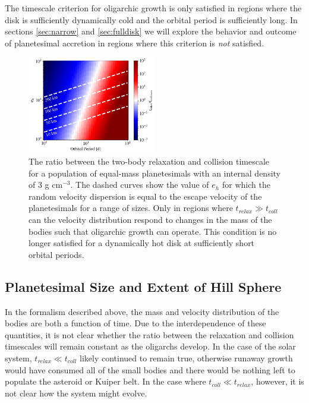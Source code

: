 The timescale criterion for oligarchic growth is only satisfied in regions where the
disk is sufficiently dynamically cold and the orbital period is
sufficiently long. In sections \ref{sec:narrow} and \ref{sec:fulldisk}
we will explore the behavior and outcome of planetesimal accretion in regions where this criterion is \textit{not} satisfied. 

\begin{figure}
\begin{center}
    \includegraphics[width=0.5\textwidth]{figures/plStip/timescales.png}
    \caption{The ratio between the two-body relaxation and collision
      timescale for a population of equal-mass planetesimals with an
      internal density of 3 g cm$^{-3}$. The dashed curves show 
      the value of $e_{h}$ for which the random velocity dispersion is equal
      to the escape velocity of the planetesimals for a range of sizes. Only
      in regions where $t_{relax} \gg t_{coll}$ can the velocity distribution 
      respond to changes in the mass of the bodies such that oligarchic 
      growth can operate. This condition is no longer satisfied for a 
      dynamically hot disk at sufficiently short orbital periods.\label{fig:timescales}}
\end{center}
\end{figure}

\subsection{Planetesimal Size and Extent of Hill Sphere}\label{sec:sizeandhill}

In the formalism described above, the mass and velocity distribution
of the bodies are both a function of time. Due to the interdependence
of these quantities, it is not clear whether the ratio between the relaxation and collision timescales will remain constant as the
oligarchs develop. In the case of the solar system, $t_{relax} \ll t_{coll}$ likely continued to remain true, otherwise runaway 
growth would have consumed all of the small bodies and there would be nothing left to populate the asteroid or Kuiper belt. In 
the case where $t_{coll} \ll t_{relax}$, however, it is not clear how the system might evolve.

